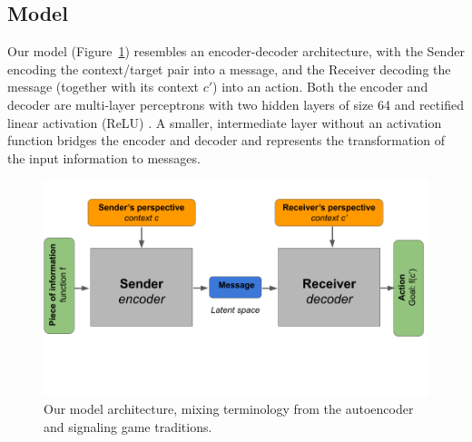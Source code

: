 \documentclass[11pt,a4paper]{article}
\DeclareMathOperator*{\argmax}{arg\,max}
\DeclareMathOperator*{\argmin}{arg\,min}
\newcommand{\nbSST}[1]{{\leavevmode\color{violet}{\scriptsize#1}}}
\begin{document}


\subsection{Model}

Our model (Figure~\ref{fig:model}) resembles an encoder-decoder architecture, with the Sender encoding the context/target pair into a message, and the Receiver decoding the message (together with its context $c'$) into an action.  Both the encoder and decoder are multi-layer perceptrons with two hidden layers of size 64 and rectified linear activation (ReLU) \citep{Nair2010, Glorot2011}. A smaller, intermediate layer without an activation function bridges the encoder and decoder and represents the transformation of the input information to messages. 

\begin{figure}[ht]
	\centering
	\includegraphics[width=\columnwidth, trim=0 150 0 40]{figures/model_figure_v2.png}
	\caption{Our model architecture, mixing terminology from the autoencoder and signaling game traditions.}
	\label{fig:model}
\end{figure}
\end{document}
